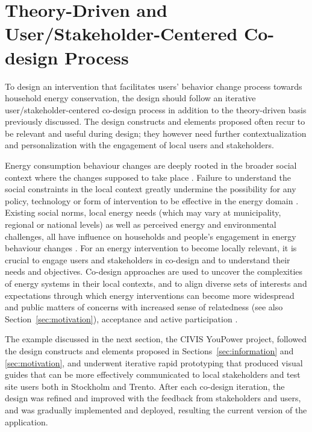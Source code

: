 \documentclass[a4paper]{article}
\begin{document}
\section{Theory-Driven and User/Stakeholder-Centered Co-design Process}
\label{sec:codesign}

To design an intervention that facilitates users' behavior change process towards household energy conservation, the design should follow an iterative user/stakeholder-centered co-design process in addition to the theory-driven basis previously discussed. The design constructs and elements proposed often recur to be relevant and useful during design; they however need further contextualization and personalization with the engagement of local users and stakeholders. 

Energy consumption behaviour changes are deeply rooted in the broader social context where the changes supposed to take place \citep{Owens2008}. Failure to understand the social constraints in the local context greatly undermine the possibility for any policy, technology or form of intervention to be effective in the energy domain \citep{Devine-Wright2005}. Existing social norms, local energy needs (which may vary at municipality, regional or national levels) as well as perceived energy and environmental challenges, all have influence on households and people's engagement in energy behaviour changes \citep{+}. For an energy intervention to become locally relevant, it is crucial to engage users and stakeholders in co-design and to understand their needs and objectives. Co-design approaches are used to uncover the complexities of energy systems in their local contexts, and to align diverse sets of interests and expectations \citep{Tang2008,Dick2012} through which energy interventions can become more widespread and public matters of concerns \citep{DiSalvo2014} with increased sense of relatedness (see also Section~\ref{sec:motivation}), acceptance and active participation \citep{Throndsen2015,Marres2012,Brynjarsdottir2012,pierce2003state,schwartz2015people,edward2015review}. 

The example discussed in the next section, the CIVIS YouPower project, followed the design constructs and elements proposed in Sections~\ref{sec:information} and \ref{sec:motivation}, and underwent iterative rapid prototyping that produced visual guides that can be more effectively communicated to local stakeholders and test site users both in Stockholm and Trento. After each co-design iteration, the design was refined and improved with the feedback from stakeholders and users, and was gradually implemented and deployed, resulting the current version of the application.
\end{document}
